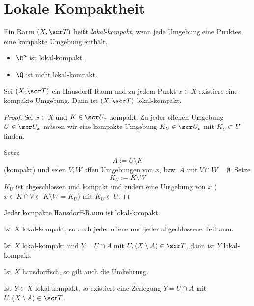 \section{Lokale Kompaktheit}


\begin{df}
	Ein Raum $(X, \scr T)$ heißt \emph{lokal-kompakt}, wenn jede Umgebung eine Punktes eine kompakte Umgebung enthält.
\end{df}

\begin{ex}
	\begin{itemize}
		\item
			$\R^n$ ist lokal-kompakt.
		\item
			$\Q$ ist nicht lokal-kompakt.
	\end{itemize}
\end{ex}

\begin{st}
	Sei $(X, \scr T)$ ein Hausdorff-Raum und zu jedem Punkt $x \in X$ existiere eine kompakte Umgebung.
	Dann ist $(X, \scr T)$ lokal-kompakt.
	\begin{proof}
		Sei $x \in X$ und $K \in \scr U_x$ kompakt.
		Zu jeder offenen Umgebung $U \in \scr U_x$ müssen wir eine kompakte Umgebung $K_U \in \scr U_x$ mit $K_U \subset U$ finden.

		Setze
		\[
			A := U \setminus K
		\]
		(kompakt) und seien $V, W$ offen Umgebungen von $x$, bzw. $A$ mit $V \cap W = \emptyset$.
		Setze
		\[
			K_U := K \setminus W
		\]
		$K_U$ ist abgeschlossen und kompakt und zudem eine Umgebung von $x$ ($x \in K \cap V \subset K \setminus W = K_U$) mit $K_U \subset U$.
	\end{proof}
\end{st}

\begin{kor}
	Jeder kompakte Hausdorff-Raum ist lokal-kompakt.
\end{kor}

\begin{lem}
	Ist $X$ lokal-kompakt, so auch jeder offene und jeder abgechlossene Teilraum.
\end{lem}

\begin{st}
	Ist $X$ lokal-kompakt und $Y = U \cap A$ mit $U, (X \setminus A) \in \scr T$, dann ist $Y$ lokal-kompakt.

	Ist $X$ hausdorffsch, so gilt auch die Umkehrung.

	Ist $Y \subset X$ lokal-kompakt, so existiert eine Zerlegung $Y = U \cap A$ mit $U, (X \setminus A) \in \scr T$.
\end{st}

